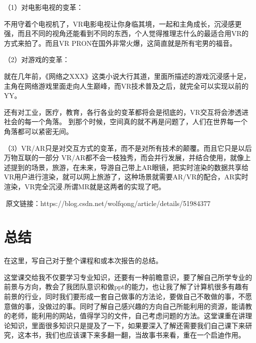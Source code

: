 \documentclass{article}
\begin{document}
（1）对电影电视的变革：\par
 不用守着个电视机了，VR电影电视让你身临其境，一起和主角成长，沉浸感更强，而且不同的视角还能看到不同的东西，个人觉得推理志什么的最适合用VR的方式来拍了。而且VR PRON在国外非常火爆，这简直就是所有宅男的福音。\par
（2）对游戏的变革：\par
就在几年前，《网络之XXX》这类小说大行其道，里面所描述的游戏沉浸感十足，主角在网络游戏里面走向人生巅峰，而VR技术普及之后，就完全可以实现以前的YY。\par
还有对工业，医疗，教育，各行各业的变革都将会是彻底的，VR交互将会渗透进社会的每一个角落。 到那个时候，空间真的就不再是问题了，人们在世界每一个角落都可以紧密无间。\par
（3）VR/AR只是对交互方式的变革，而不是对所有技术的颠覆。而且它只是以后万物互联的一部分 VR/AR都不会一枝独秀，而会并行发展，并结合使用，就像上述提到的场景，旅游，在未来，导游自己带上AR眼镜，把实时渲染的数据共享给VR用户进行渲染，就可以网上旅游了，这种场景就需要AR/VR的配合，AR实时渲染，VR完全沉浸.所谓MR就是这两者的实现了吧。\par
原文链接：https://blog.csdn.net/wolfqong/article/details/51984377\par



\section{总结}
在这里，写自己对于整个课程和或本次报告的总结。\par
这堂课交给我不仅要学习专业知识，还要有一种前瞻意识，要了解自己所学专业的前景与方向，教会了我团队意识和做ppt的能力，也让我了解了计算机很多有趣有前景的行业，同时我们要形成一套自己做事的方法论，要做自己不敢做的事，不愿意做的事，没做过的事。同时了解自己感兴趣的方向自己所能利用的资源，能请教的老师，能利用的网站，值得学习的文件，自己考虑问题的方法。这堂课重在讲理论知识，里面很多知识只是提及了一下，如果要深入了解还需要我们自己课下来研究，这本书，我们也应该课下来多翻一翻，当故事书来看，重在一个启迪作用。\par
\end{document}
